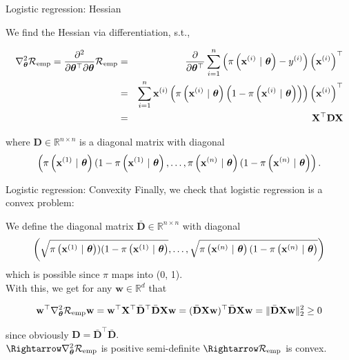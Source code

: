 \documentclass[11pt,compress,t,notes=noshow, xcolor=table]{beamer}
\begin{document}
\begin{vbframe}{Logistic regression: Hessian}

We find the Hessian via differentiation, s.t.,

\begin{align*}
  \nabla^2_{\thetab}\riske  = \frac{\partial^2}{\partial{\thetab^\top}\partial\thetab}\riske  & = & 
 \frac{\partial}{\partial{\thetab^\top}} \sumin \left(\pixit - \yi\right)\left(\xi\right)^\top\\
 & = & 
  \sum^n_{i=1}\xi \left(\pixit\left(1-\pixit\right)\right)\left(\xi\right)^\top\\
  & = & 
\mathbf{X}^\top \mathbf{D} \mathbf{X}\\
\end{align*}

where $\mathbf{D} \in \mathbb{R}^{n\times n}$ is a diagonal matrix with diagonal 
$$\left(\pixit[1](1-\pixit[1], \dots, \pixit[n](1-\pixit[n]\right).$$

\end{vbframe}

\begin{vbframe}{Logistic regression: Convexity}
Finally, we check that logistic regression is a convex problem:
\vspace*{0.3cm}

We define the diagonal matrix $\bar{\mathbf{D}} \in \mathbb{R}^{n \times n}$ with diagonal 
$$\left(\sqrt{\pixit[1])(1-\pixit[1]}, \dots, \sqrt{\pixit[n](1-\pixit[n]}\right) $$
which is possible since $\pi$ maps into (0, 1). \\
\vspace*{0.3cm}
With this, we get for any $\mathbf{w} \in \mathbb{R}^d$ that

$$\mathbf{w}^\top  \nabla^2_{\thetab}\riske \mathbf{w} =   \mathbf{w}^\top  \mathbf{X}^\top \bar{\mathbf{D}}^\top \bar{\mathbf{D}}\mathbf{X} \mathbf{w} = (\bar{\mathbf{D}}\mathbf{X} \mathbf{w})^\top\bar{\mathbf{D}}\mathbf{X} \mathbf{w} = \Vert \bar{\mathbf{D}}\mathbf{X} \mathbf{w} \Vert^2_2 \geq 0$$

since obviously $\mathbf{D} = \bar{\mathbf{D}}^\top \bar{\mathbf{D}}.$ \\
\vspace*{0.3cm}
$\Rightarrow \nabla^2_{\thetab}\riske$ is positive semi-definite $\Rightarrow \riske$ is convex.

\end{vbframe}

\endlecture
\end{document}
